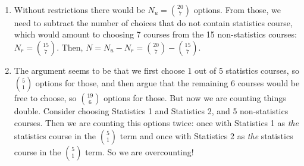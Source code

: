 
\setcounter{theorem}{9}

\begin{exercise}[BH.1.10]
\begin{solution}~
	 \begin{enumerate}
	 	\item Without restrictions there would be $N_{u}={20\choose 7}$ options. From those, we need to subtract the number of choices that do not contain statistics course, which would amount to choosing 7 courses from the 15 non-statistics courses: $N_{r} = {15\choose 7}$. Then, $N=N_{u}-N_{r}={20\choose 7}-{15 \choose 7}$.
		\item The argument seems to be that we first choose 1 out of 5 statistics courses, so ${5 \choose 1}$ options for those, and then argue that the remaining 6 courses would be free to choose, so ${19 \choose 6}$ options for those. But now we are counting things double. Consider choosing Statistics 1 and Statistics 2, and 5 non-statistics courses. Then we are counting this options twice: once with Statistics 1 as \textit{the} statistics course in the ${5 \choose 1}$ term and once with Statistics 2 as \textit{the} statistics course in the ${5 \choose 1}$ term. So we are overcounting!
	 \end{enumerate}
\end{solution}
\end{exercise}

